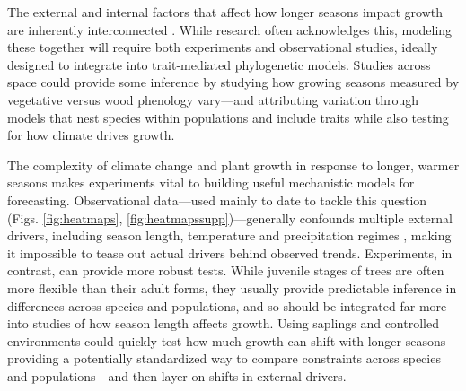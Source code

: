 \documentclass[11pt]{article}
\begin{document}
The external and internal factors that affect how longer seasons impact growth are inherently interconnected \citep{nobel1983biophysical}. While research often acknowledges this, modeling these together will require both experiments and observational studies, ideally designed to integrate into trait-mediated phylogenetic models. Studies across space could provide some inference by studying how growing seasons measured by vegetative versus wood phenology vary---and attributing variation through models that nest species within populations and include traits while also testing for how climate drives growth.  


The complexity of climate change and plant growth in response to longer, warmer seasons makes experiments vital to building useful mechanistic models for forecasting. Observational data---used mainly to date to tackle this question (Figs. \ref{fig:heatmaps}, \ref{fig:heatmapssupp})---generally confounds multiple external drivers, including season length, temperature and precipitation regimes \citep{ren2019,ipcc2021,camarero2022decoupled}, making it impossible to tease out actual drivers behind observed trends. Experiments, in contrast, can provide more robust tests. While juvenile stages of trees are often more flexible than their adult forms, they usually provide predictable inference in differences across species and populations, and so should be integrated far more into studies of how season length affects growth. Using saplings and controlled environments could quickly test how much growth can shift with longer seasons---providing a potentially standardized way to compare constraints across species and populations---and then layer on shifts in external drivers. %
\end{document}
